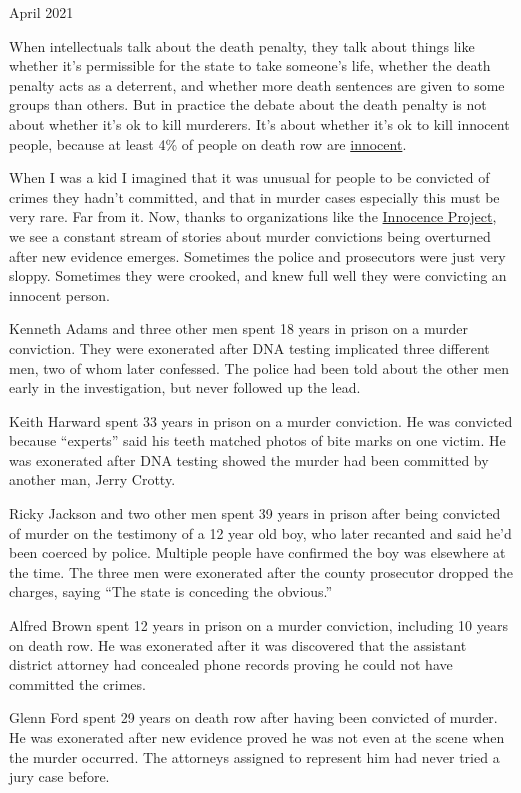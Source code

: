 April 2021

When intellectuals talk about the death penalty, they talk about things
like whether it's permissible for the state to take someone's life,
whether the death penalty acts as a deterrent, and whether more death
sentences are given to some groups than others. But in practice the
debate about the death penalty is not about whether it's ok to kill
murderers. It's about whether it's ok to kill innocent people, because
at least 4\% of people on death row are
\href{https://www.pnas.org/content/111/20/7230}{innocent}.

When I was a kid I imagined that it was unusual for people to be
convicted of crimes they hadn't committed, and that in murder cases
especially this must be very rare. Far from it. Now, thanks to
organizations like the
\href{https://innocenceproject.org/all-cases}{Innocence Project}, we see
a constant stream of stories about murder convictions being overturned
after new evidence emerges. Sometimes the police and prosecutors were
just very sloppy. Sometimes they were crooked, and knew full well they
were convicting an innocent person.

Kenneth Adams and three other men spent 18 years in prison on a murder
conviction. They were exonerated after DNA testing implicated three
different men, two of whom later confessed. The police had been told
about the other men early in the investigation, but never followed up
the lead.

Keith Harward spent 33 years in prison on a murder conviction. He was
convicted because ``experts'' said his teeth matched photos of bite
marks on one victim. He was exonerated after DNA testing showed the
murder had been committed by another man, Jerry Crotty.

Ricky Jackson and two other men spent 39 years in prison after being
convicted of murder on the testimony of a 12 year old boy, who later
recanted and said he'd been coerced by police. Multiple people have
confirmed the boy was elsewhere at the time. The three men were
exonerated after the county prosecutor dropped the charges, saying ``The
state is conceding the obvious.''

Alfred Brown spent 12 years in prison on a murder conviction, including
10 years on death row. He was exonerated after it was discovered that
the assistant district attorney had concealed phone records proving he
could not have committed the crimes.

Glenn Ford spent 29 years on death row after having been convicted of
murder. He was exonerated after new evidence proved he was not even at
the scene when the murder occurred. The attorneys assigned to represent
him had never tried a jury case before.

